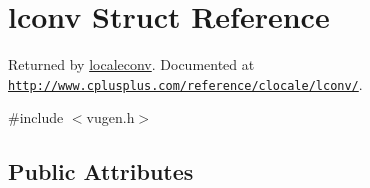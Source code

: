 \hypertarget{structlconv}{\section{lconv Struct Reference}
\label{structlconv}
}


Returned by \hyperlink{group__locale_ga69b40f71a20a7c8bd67b9eeeae7f40c9}{localeconv}. Documented at \href{http://www.cplusplus.com/reference/clocale/lconv/}{\tt http\-://www.\-cplusplus.\-com/reference/clocale/lconv/}.  




{\ttfamily \#include $<$vugen.\-h$>$}

\subsection*{Public Attributes}
